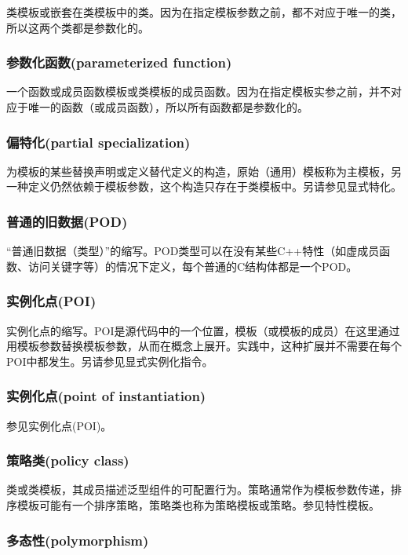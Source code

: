 类模板或嵌套在类模板中的类。因为在指定模板参数之前，都不对应于唯一的类，所以这两个类都是参数化的。

\subsubsection{参数化函数(parameterized function)}

一个函数或成员函数模板或类模板的成员函数。因为在指定模板实参之前，并不对应于唯一的函数（或成员函数），所以所有函数都是参数化的。

\subsubsection{偏特化(partial specialization)}

为模板的某些替换声明或定义替代定义的构造，原始（通用）模板称为主模板，另一种定义仍然依赖于模板参数，这个构造只存在于类模板中。另请参见显式特化。

\subsubsection{普通的旧数据(POD)}

“普通旧数据（类型）”的缩写。POD类型可以在没有某些C++特性（如虚成员函数、访问关键字等）的情况下定义，每个普通的C结构体都是一个POD。

\subsubsection{实例化点(POI)}

实例化点的缩写。POI是源代码中的一个位置，模板（或模板的成员）在这里通过用模板参数替换模板参数，从而在概念上展开。实践中，这种扩展并不需要在每个POI中都发生。另请参见显式实例化指令。

\subsubsection{实例化点(point of instantiation)}

参见实例化点(POI)。

\subsubsection{策略类(policy class)}

类或类模板，其成员描述泛型组件的可配置行为。策略通常作为模板参数传递，排序模板可能有一个排序策略，策略类也称为策略模板或策略。参见特性模板。

\subsubsection{多态性(polymorphism)}

